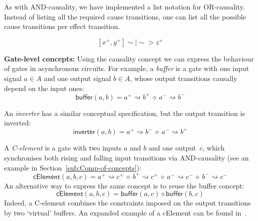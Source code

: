 \documentclass[british, journal]{IEEEtran}
\begin{document}
As with AND-causality, we have implemented a list notation for OR-causality. Instead of listing
all the required cause transitions, one can list all the possible cause transitions per effect transition.

\[
[x^{+}, y^{+}]\sim|\sim>z^{+}
\]

\textbf{Gate-level concepts:} Using the causality concept we can express
the behaviour of gates in asynchronous circuits. For example, a \emph{buffer}
is a gate with one input signal $a\in A$ and one output signal $b\in A$,
whose output transitions causally depend on the input ones:
\[
\mathsf{buffer}(a, b)=a^{+}\rightsquigarrow b^{+}\ \diamond\
a^{-}\rightsquigarrow b^{-}
\]

An \emph{inverter} has a similar conceptual specification, but the
output transition is inverted:
\[
\mathsf{inverter}(a, b)=a^{+}\rightsquigarrow b^{-}\ \diamond\
a^{-}\rightsquigarrow b^{+}
\]


A \emph{C-element} is a gate with two inputs $a$ and $b$ and one
output~$c$, which synchronises both rising and falling input transitions
via AND-causality (see an example in Section~\ref{sub:Comp-of-concepts}):
\[
\mathsf{cElement}(a, b, c)=a^{+}\!\rightsquigarrow\! c^{+}\ \diamond\
b^{+}\!\rightsquigarrow\! c^{+}\ \diamond\ a^{-}\!\rightsquigarrow\! c^{-}\
\diamond\ b^{-}\!\rightsquigarrow\! c^{-}
\]
An alternative way to express the same concept is to reuse the buffer concept:
\[
\mathsf{cElement}(a, b, c)=\mathsf{buffer}(a, c) \diamond \mathsf{buffer}(b, c)
\]
Indeed, a C-element combines the constraints imposed on the output
transitions by two `virtual' buffers. An expanded example of a cElement can be
found in~\cite{2015_Beaumont_MEMOCODE}.
\end{document}
